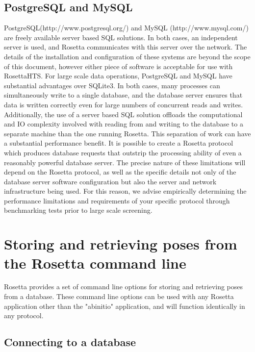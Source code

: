 \subsection{PostgreSQL and MySQL}

PostgreSQL(http://www.postgresql.org/) and MySQL (http://www.mysql.com/) are freely available server based SQL solutions.
In both cases, an independent server is used, and Rosetta communicates with this server over the network.
The details of the installation and configuration of these systems are beyond the scope of this document, however either piece of software is acceptable for use with RosettaHTS. 
For large scale data operations, PostgreSQL and MySQL have substantial advantages over SQLite3. 
In both cases, many processes can simultaneously write to a single database, and the database server ensures that data is written correctly even for large numbers of concurrent reads and writes.
Additionally, the use of a server based SQL solution offloads the computational and IO complexity involved with reading from and writing to the database to a separate machine than the one running Rosetta.
This separation of work can have a substantial performance benefit.
It is possible to create a Rosetta protocol which produces database requests that outstrip the processing ability of even a reasonably powerful database server.
The precise nature of these limitations will depend on the Rosetta protocol, as well as the specific details not only of the database server software configuration but also the server and network infrastructure being used.
For this reason, we advise empirically determining the performance limitations and requirements of your specific protocol through benchmarking tests prior to large scale screening. 

\section{Storing and retrieving poses from the Rosetta command line}

Rosetta provides a set of command line options for storing and retrieving poses from a database.
These command line options can be used with any Rosetta application other than the "abinitio" application, and will function identically in any protocol.

\subsection{Connecting to a database}

